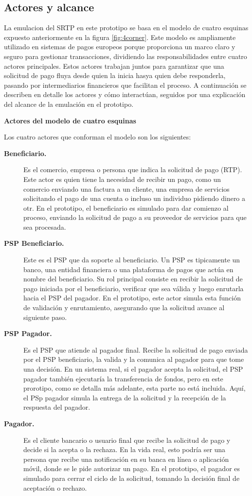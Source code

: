 \subsection{Actores y alcance}
\label{subsec:diseno_actores}

La emulacion del SRTP en este prototipo se basa en el modelo de cuatro esquinas expuesto anteriormente en la figura \ref{fig:4corner}. Este modelo es ampliamente utilizado en sistemas de pagos europeos porque proporciona un marco claro y seguro para gestionar transacciones, dividiendo las responsabilidades entre cuatro actores principales. Estos actores trabajan juntos para garantizar que una solicitud de pago fluya desde quien la inicia hasya quien debe responderla, pasando por intermediarios financieros que facilitan el proceso. A continuación se describen en detalle los actores y cómo interactúan, seguidos por una explicación del alcance de la emulación en el prototipo.

\textbf{Actores del modelo de cuatro esquinas}

Los cuatro actores que conforman el modelo son los siguientes:
\begin{description}
  \item[\textbf{Beneficiario.}]
  Es el comercio, empresa o persona que indica la solicitud de pago (RTP). Este actor es quien tiene la necesidad de recibir un pago, como un comercio enviando una factura a un cliente, una empresa de servicios solicitando el pago de una cuenta o incluso un individuo pidiendo dinero a otr. En el prototipo, el beneficiario es simulado para dar comienzo al proceso, enviando la solicitud de pago a su proveedor de servicios para que sea procesada.
  \item[\textbf{PSP Beneficiario.}]
  Este es el PSP que da soporte al beneficiario. Un PSP es tipicamente un banco, una entidad financiera o una plataforma de pagos que actúa en nombre del beneficiario. Su rol principal consiste en recibir la solicitud de pago iniciada por el beneficiario, verificar que sea válida y luego enrutarla hacia el PSP del pagador. En el prototipo, este actor simula esta función de validación y enrutamiento, asegurando que la solicitud avance al siguiente paso.
  \item[\textbf{PSP Pagador.}]
  Es el PSP que atiende al pagador final. Recibe la solicitud de pago enviada por el PSP beneficiario, la valida y la comunica al pagador para que tome una decisión. En un sistema real, si el pagador acepta la solicitud, el PSP pagador también ejecutaría la transferencia de fondos, pero en este prorotipo, como se detalla más adelante, esta parte no está incluida. Aquí, el PSp pagador simula la entrega de la solicitud y la recepción de la respuesta del pagador.
  \item[\textbf{Pagador.}]
  Es el cliente bancario o usuario final que recibe la solicitud de pago y decide si la acepta o la rechaza. En la vida real, esto podría ser una persona que recibe una notificación en su banca en línea o aplicación móvil, donde se le pide autorizar un pago. En el prototipo, el pagador es simulado para cerrar el ciclo de la solicitud, tomando la decisión final de aceptación o rechazo.
\end{description}

